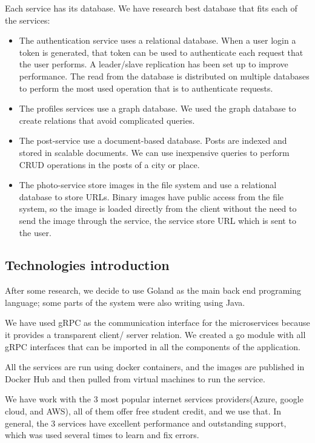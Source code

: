 Each service has its database. We have research best database that fits each of the services:
\begin{itemize}
	\item The authentication service uses a relational database. When a user login a token is generated, that token can be used to authenticate each request that the user performs. A leader/slave replication has been set up to improve performance. The read from the database is distributed on multiple databases to perform the most used operation that is to authenticate requests.
	
	\item	The profiles services use a graph database. We used the graph database to create relations that avoid complicated queries.
	
	\item The post-service use a document-based database. Posts are indexed and stored in scalable documents. We can use inexpensive queries to perform CRUD operations in the posts of a city or place.
	
	\item	The photo-service store images in the file system and use a relational database to store URLs. Binary images have public access from the file system, so the image is loaded directly from the client without the need to send the image through the service, the service store URL which is sent to the user.

\end{itemize}

\subsection{Technologies introduction}
\vskip 0.1in
\indent
\indent
After some research, we decide to use Goland as the main back end programing language; some parts of the system were also writing using Java. 

We have used gRPC as the communication interface for the microservices because it provides a transparent client/ server relation. We created a go module with all gRPC interfaces that can be imported in all the components of the application.

All the services are run using docker containers, and the images are published in Docker Hub and then pulled from virtual machines to run the service. 

We have work with the 3 most popular internet services providers(Azure, google cloud, and AWS), all of them offer free student credit, and we use that. In general, the 3 services have excellent performance and outstanding support, which was used several times to learn and fix errors.

